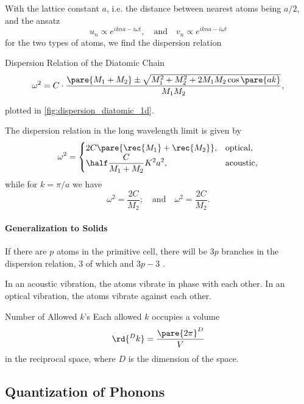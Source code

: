\documentclass[hidelinks]{article}
\begin{document}
With the lattice constant $a$, i.e. the distance between nearest atoms being $a/2$, and the ansatz
\[ u_n \propto e^{ikna - i\omega t},\quad \text{and}\quad v_n \propto e^{ikna - i\omega t} \]
for the two types of atoms, we find the dispersion relation
\begin{finaleq}{Dispersion Relation of the Diatomic Chain}
    \[ \omega^2 = C\cdot \frac{\pare{M_1 + M_2} \pm \sqrt{M_1^2 + M_2^2 + 2M_1 M_2 \cos \pare{ak}}}{M_1 M_2}, \]
\end{finaleq}
plotted in \cref{fig:dispersion_diatomic_1d}.
\par
The dispersion relation in the long wavelength limit is given by
\[ \omega^2 = \begin{cases}
    \displaystyle 2C\pare{\rec{M_1} + \rec{M_2}}, & \mathrm{optical}, \\
    \displaystyle \half \frac{C}{M_1 + M_2}K^2 a^2, & \mathrm{acoustic},
\end{cases} \]
while for $k = \pi/a$ we have
\[ \omega^2 = \frac{2C}{M_2};\quad \text{and}\quad \omega^2 = \frac{2C}{M_2}. \]

\paragraph{Generalization to Solids} %
\label{par:generalization_to_solids}

If there are $p$ atoms in the primitive cell, there will be $3p$ branches in the dispersion relation, $3$ of which  and $3p - 3$ .
\par
In an acoustic vibration, the atoms vibrate in phase with each other. In an optical vibration, the atoms vibrate against each other.


\begin{finaleq}{Number of Allowed $k$'s}
    Each allowed $k$ occupies a volume 
    \[ \rd{^D k} = \frac{\pare{2\pi}^D}{V} \]
    in the reciprocal space, where $D$ is the dimension of the space.
\end{finaleq}



\subsection{Quantization of Phonons} %
\label{sub:quantization_of_phonons}
\end{document}
